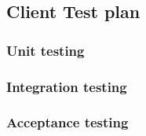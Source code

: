 \subsection{Client Test plan}
\subsubsection{Unit testing}

\subsubsection{Integration testing}

\subsubsection{Acceptance testing}
